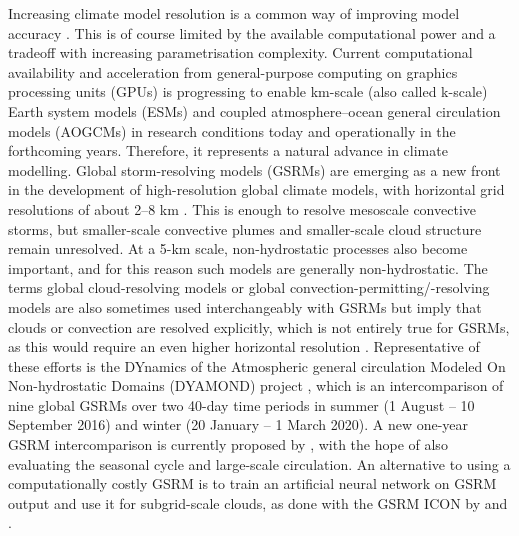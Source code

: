 \documentclass[12pt,a4paper]{article}
\begin{document}
Increasing climate model resolution is a common way of improving model accuracy
\citep{mauritsen2022}. This is of course limited by the available computational
power and a tradeoff with increasing parametrisation complexity. Current
computational availability and acceleration from general-purpose computing on
graphics processing units (GPUs) is progressing to enable km-scale (also
called k-scale) Earth system models (ESMs) and coupled atmosphere--ocean
general circulation models (AOGCMs) in research conditions today and
operationally in the forthcoming years. Therefore, it represents a natural
advance in climate modelling.  Global storm-resolving models (GSRMs) are
emerging as a new front in the development of high-resolution global climate
models, with horizontal grid resolutions of about 2--8 km
\citep{satoh2019,stevens2019}. This is enough to resolve mesoscale convective
storms, but smaller-scale convective plumes and smaller-scale cloud structure
remain unresolved. At a 5-km scale, non-hydrostatic processes also become
important, and for this reason such models are generally non-hydrostatic. The
terms global cloud-resolving models or global convection-permitting/-resolving
models are also sometimes used interchangeably with GSRMs but imply that clouds
or convection are resolved explicitly, which is not entirely true for GSRMs, as
this would require an even higher horizontal resolution \citep{satoh2019}.
Representative of these efforts is the DYnamics of the Atmospheric general
circulation Modeled On Non-hydrostatic Domains (DYAMOND) project
\citep{stevens2019,dyamond}, which is an intercomparison of nine global GSRMs
over two 40-day time periods in summer (1 August -- 10 September 2016) and winter
(20 January -- 1 March 2020). A new one-year GSRM intercomparison is currently
proposed by \cite{takasuka2024}, with the hope of also evaluating the seasonal
cycle and large-scale circulation.  An alternative to using a computationally
costly GSRM is to train an artificial neural network on GSRM output and use it
for subgrid-scale clouds, as done with the GSRM ICON by \cite{grundner2022} and
\cite{grundner2023}.
\end{document}
